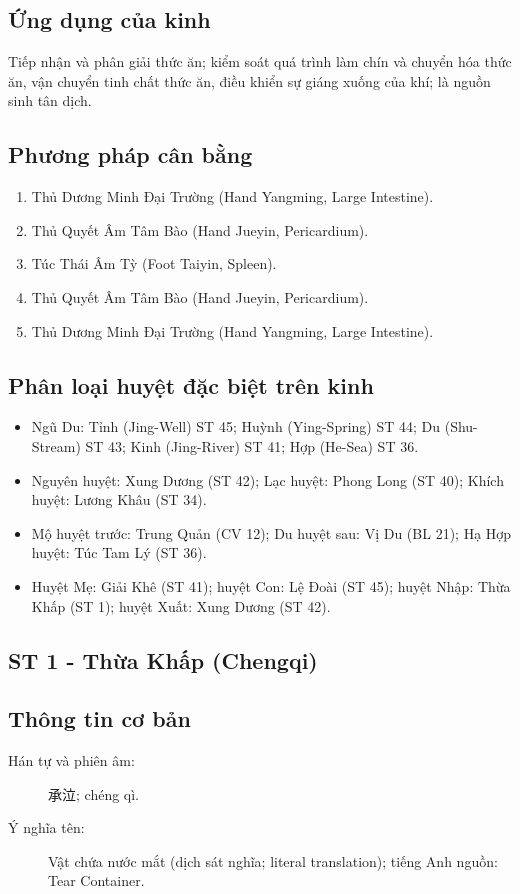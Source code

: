 \documentclass[12pt,a4paper]{article}
\begin{document}
\subsection*{Ứng dụng của kinh}
Tiếp nhận và phân giải thức ăn; kiểm soát quá trình làm chín và chuyển hóa thức ăn, vận chuyển tinh chất thức ăn, điều khiển sự giáng xuống của khí; là nguồn sinh tân dịch.
\subsection*{Phương pháp cân bằng}
\begin{enumerate}\item Thủ Dương Minh Đại Trường (Hand Yangming, Large Intestine).\item Thủ Quyết Âm Tâm Bào (Hand Jueyin, Pericardium).\item Túc Thái Âm Tỳ (Foot Taiyin, Spleen).\item Thủ Quyết Âm Tâm Bào (Hand Jueyin, Pericardium).\item Thủ Dương Minh Đại Trường (Hand Yangming, Large Intestine).\end{enumerate}
\subsection*{Phân loại huyệt đặc biệt trên kinh}
\begin{itemize}\item Ngũ Du: Tỉnh (Jing-Well) ST 45; Huỳnh (Ying-Spring) ST 44; Du (Shu-Stream) ST 43; Kinh (Jing-River) ST 41; Hợp (He-Sea) ST 36.\item Nguyên huyệt: Xung Dương (ST 42); Lạc huyệt: Phong Long (ST 40); Khích huyệt: Lương Khâu (ST 34).\item Mộ huyệt trước: Trung Quản (CV 12); Du huyệt sau: Vị Du (BL 21); Hạ Hợp huyệt: Túc Tam Lý (ST 36).\item Huyệt Mẹ: Giải Khê (ST 41); huyệt Con: Lệ Đoài (ST 45); huyệt Nhập: Thừa Khấp (ST 1); huyệt Xuất: Xung Dương (ST 42).\end{itemize}
\subsection{ST 1 - Thừa Khấp (Chengqi)}
\subsection*{Thông tin cơ bản}\begin{description}\item[Hán tự và phiên âm:] 承泣; chéng qì.\item[Ý nghĩa tên:] Vật chứa nước mắt (dịch sát nghĩa; literal translation); tiếng Anh nguồn: Tear Container.\end{description}
\end{document}
